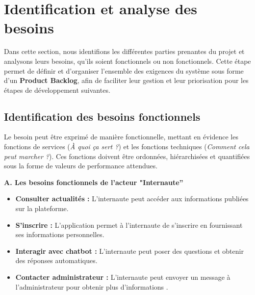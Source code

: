 \section{Identification et analyse des besoins}
\label{section2.3}

Dans cette section, nous identifions les différentes parties prenantes du projet 
et analysons leurs besoins, qu'ils soient fonctionnels ou non fonctionnels. Cette 
étape permet de définir et d'organiser l'ensemble des exigences du système sous 
forme d'un \textbf{Product Backlog}, afin de faciliter leur gestion et leur 
priorisation pour les étapes de développement suivantes.

\subsection{Identification des besoins fonctionnels}
\label{section2.3.1}

Le besoin peut être exprimé de manière fonctionnelle, mettant en évidence les 
fonctions de services (\textit{À quoi ça sert ?}) et les fonctions techniques 
(\textit{Comment cela peut marcher ?}). Ces fonctions doivent être ordonnées, 
hiérarchisées et quantifiées sous la forme de valeurs de performance attendues.\cite{ISO}

\vspace{0.4cm}
\noindent\textbf{A. Les besoins fonctionnels de l'acteur "Internaute''}
\begin{itemize}
    \item \textbf{Consulter actualités :} L'internaute peut accéder aux informations 
    publiées sur la plateforme.
    \item \textbf{S'inscrire :} L'application permet à l'internaute de s'inscrire 
    en fournissant ses informations personnelles.
    \item \textbf{Interagir avec chatbot :} L'internaute peut poser des questions et 
    obtenir des réponses automatiques.
    \item \textbf{Contacter administrateur :} L'internaute peut envoyer un message à 
    l'administrateur pour obtenir plus d’informations .
\end{itemize}

